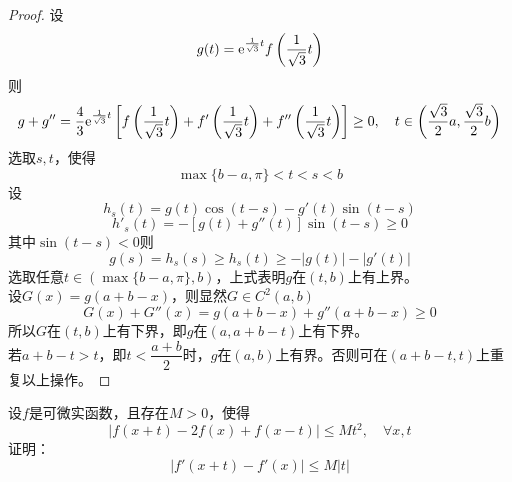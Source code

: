 \begin{proof}

    设
    $$g(t) = \mathrm{e}^{\frac{1}{\sqrt{3}}t}f\left( \frac{1}{\sqrt{3}}t \right)$$
    则
    $$g + g'' = \dfrac{4}{3}\mathrm{e}^{\frac{1}{\sqrt{3}}t} \left[ f\left(\dfrac{1}{\sqrt{3}}t\right) + f'\left(\frac{1}{\sqrt{3}}t\right) + f''\left(\frac{1}{\sqrt{3}}t\right) \right] \geq 0, \quad t \in \left( \dfrac{\sqrt{3}}{2}a, \dfrac{\sqrt{3}}{2}b \right)$$
    选取$s,t$，使得
    $$\max\{b-a, \pi\} < t < s < b$$
    设
    $$h_s(t) = g(t) \cos(t-s) - g'(t)\sin(t-s)$$
    $$h'_s(t) = -[g(t) + g''(t)] \sin(t-s) \geq 0$$
    其中$\sin(t-s) < 0$则
    $$g(s) = h_s(s) \geq h_s(t) \geq -|g(t)| - |g'(t)|$$
    选取任意$t \in (\max\{b-a,\pi\},b)$，上式表明$g$在$(t,b)$上有上界。\\
    设$G(x) = g(a + b -x)$，则显然$G \in C^2(a,b)$
    $$G(x) + G''(x) = g(a+b-x) + g''(a+b-x) \geq 0$$
    所以$G$在$(t,b)$上有下界，即$g$在$(a, a+b-t)$上有下界。\\
    若$a + b -t > t$，即$t < \dfrac{a+b}{2}$时，$g$在$(a,b)$上有界。否则可在$(a+b -t ,t)$上重复以上操作。

\end{proof}

\begin{proposition}

    设$f$是可微实函数，且存在$M > 0$，使得
    $$|f(x+t) - 2f(x) + f(x-t)| \leq Mt^2, \quad \forall x,t$$
    证明：
    $$|f'(x+t) - f'(x)| \leq M|t|$$

\end{proposition}

